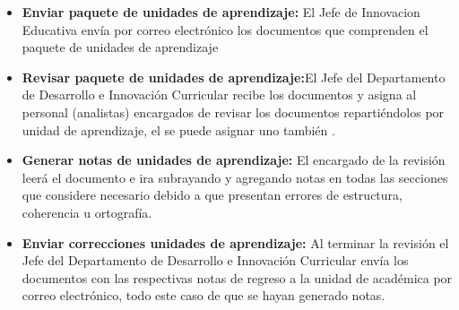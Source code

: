 \begin{itemize}
	\item \textbf{Enviar paquete de  unidades de aprendizaje:} El Jefe de Innovacion Educativa  envía por correo electrónico los documentos que comprenden el paquete de unidades de aprendizaje  
	\item \textbf{Revisar paquete de  unidades de aprendizaje:}El Jefe del Departamento de Desarrollo e Innovación Curricular recibe los documentos y asigna al personal (analistas) encargados de revisar los documentos repartiéndolos por unidad de aprendizaje, el se puede asignar uno también . 
	\item \textbf{Generar notas de  unidades de aprendizaje:} El encargado de la revisión leerá el documento e ira subrayando y agregando notas en todas las secciones que considere necesario debido a que presentan errores de estructura, coherencia u ortografía.  
	\item \textbf{Enviar correcciones unidades de aprendizaje:} Al terminar la revisión el Jefe del Departamento de Desarrollo e Innovación Curricular envía los documentos con las respectivas notas de regreso a la unidad de académica por correo electrónico, todo este caso de que se hayan generado notas. 
\end{itemize}